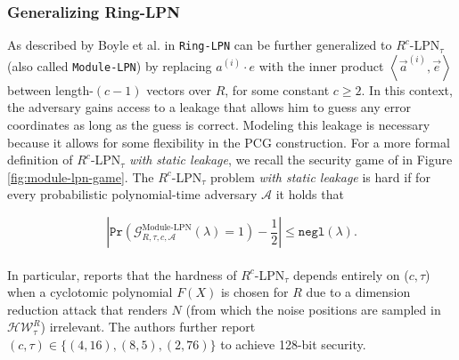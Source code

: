\subsubsection{Generalizing Ring-LPN}
As described by Boyle et al. in \cite{boyle2020efficient} \texttt{Ring-LPN} can be further generalized to $R^{c}$-LPN$_{\tau}$ (also called \texttt{Module-LPN}) by replacing $a^{(i)} \cdot e$ with the inner product $\left\langle\vec{a}^{(i)}, \vec{e}\right\rangle$ between length-$(c-1)$ vectors over $R$, for some constant $c \geq 2$. In this context, the adversary gains access to a leakage that allows him to guess any error coordinates as long as the guess is correct. Modeling this leakage is necessary because it allows for some flexibility in the PCG construction. For a more formal definition of $R^{c}$-LPN$_{\tau}$ \textit{with} \textit{static leakage}, we recall the security game of \cite{abram2022low} in Figure \ref{fig:module-lpn-game}. The $R^{c}$-LPN$_{\tau}$ problem \textit{with static leakage} is hard if for every probabilistic polynomial-time adversary $\mathcal{A}$ it holds that

$$
\left|\texttt{Pr}\left(\mathcal{G}_{R, \tau, c,\mathcal{A}}^{\text{Module-LPN}}(\lambda) = 1\right) - \frac{1}{2}\right|\leq \texttt{negl}(\lambda) .
$$
\\
In particular, \cite{boyle2020efficient} reports that the hardness of $R^{c}$-LPN$_{\tau}$ depends entirely on ($c,\tau$) when a cyclotomic polynomial $F(X)$ is chosen for $R$ due to a dimension reduction attack that renders $N$ (from which the noise positions are sampled in $\mathcal{H W}_{\tau}^{R}$) irrelevant. The authors further report $(c,\tau) \in \{(4,16),(8,5),(2,76)\}$ to achieve 128-bit security.

